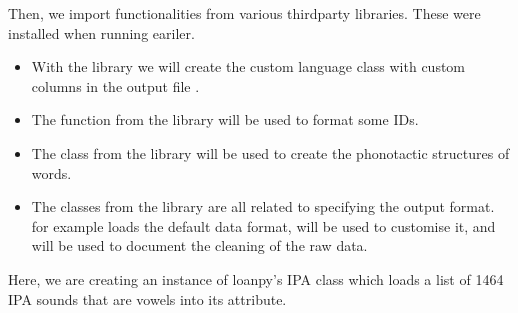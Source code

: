 \documentclass[letterpaper,10pt,english]{sphinxmanual}
\begin{document}
\sphinxAtStartPar
Then, we import functionalities from various third\sphinxhyphen{}party libraries.
These were installed when running
 eariler.
\begin{itemize}
\item {} 
\sphinxAtStartPar
With the  library
we will create the custom language class with custom columns in the output
file .

\item {} 
\sphinxAtStartPar
The 
function from the  library
will be used to format some IDs.

\item {} 
\sphinxAtStartPar
The 
class from the 
library will be used to create the phonotactic structures of words.

\item {} 
\sphinxAtStartPar
The classes from the 
library are all related to specifying the output format.  for
example loads the default data format,  will be used to customise
it, and  will be used to document the cleaning of the raw data.

\end{itemize}

\begin{sphinxVerbatim}[commandchars=\\\{\}]
  
\end{sphinxVerbatim}

\sphinxAtStartPar
Here, we are creating an instance of loanpy’s IPA class which loads
a list of 1464 IPA sounds that are vowels into its  attribute.

\begin{sphinxVerbatim}[commandchars=\\\{\}]
   
      \PYG{p}{[}      \PYG{p}{]}
\end{sphinxVerbatim}
\end{document}
